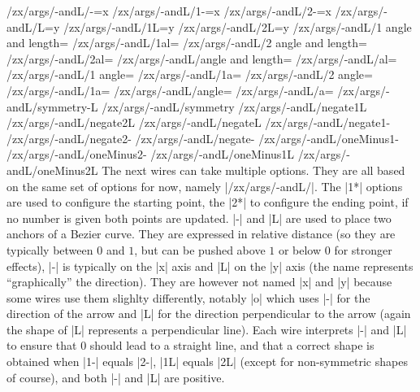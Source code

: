 \documentclass[a4paper]{ltxdoc}
\begin{document}
{\begin{pgfmanualentry}
  \makeatletter
  \def\extrakeytext{style, }
  \extractkey/zx/args/-andL/-=x\@nil%
  \extractkey/zx/args/-andL/1-=x\@nil%
  \extractkey/zx/args/-andL/2-=x\@nil%
  \extractkey/zx/args/-andL/L=y\@nil%
  \extractkey/zx/args/-andL/1L=y\@nil%
  \extractkey/zx/args/-andL/2L=y\@nil%
  \extractkey/zx/args/-andL/1 angle and length=\@nil%
  \extractkey/zx/args/-andL/1al=\@nil%
  \extractkey/zx/args/-andL/2 angle and length=\@nil%
  \extractkey/zx/args/-andL/2al=\@nil%
  \extractkey/zx/args/-andL/angle and length=\@nil%
  \extractkey/zx/args/-andL/al=\@nil%
  \extractkey/zx/args/-andL/1 angle=\@nil%
  \extractkey/zx/args/-andL/1a=\@nil%
  \extractkey/zx/args/-andL/2 angle=\@nil%
  \extractkey/zx/args/-andL/1a=\@nil%
  \extractkey/zx/args/-andL/angle=\@nil%
  \extractkey/zx/args/-andL/a=\@nil%
  \extractkey/zx/args/-andL/symmetry-L\@nil%
  \extractkey/zx/args/-andL/symmetry\@nil%
  \extractkey/zx/args/-andL/negate1L\@nil%
  \extractkey/zx/args/-andL/negate2L\@nil%
  \extractkey/zx/args/-andL/negateL\@nil%
  \extractkey/zx/args/-andL/negate1-\@nil%
  \extractkey/zx/args/-andL/negate2-\@nil%
  \extractkey/zx/args/-andL/negate-\@nil%
  \extractkey/zx/args/-andL/oneMinus1-\@nil%
  \extractkey/zx/args/-andL/oneMinus2-\@nil%
  \extractkey/zx/args/-andL/oneMinus1L\@nil%
  \extractkey/zx/args/-andL/oneMinus2L\@nil%
  \makeatother
  \pgfmanualbody
  The next wires can take multiple options. They are all based on the same set of options for now, namely |/zx/args/-andL/|. The |1*| options are used to configure the starting point, the |2*| to configure the ending point, if no number is given both points are updated. |-| and |L| are used to place two anchors of a Bezier curve. They are expressed in relative distance (so they are typically between $0$ and $1$, but can be pushed above $1$ or below $0$ for stronger effects), |-| is typically on the |x| axis and |L| on the |y| axis (the name represents ``graphically'' the direction). They are however not named |x| and |y| because some wires use them slighlty differently, notably |o| which uses |-| for the direction of the arrow and |L| for the direction perpendicular to the arrow (again the shape of |L| represents a perpendicular line). Each wire interprets |-| and |L| to ensure that $0$ should lead to a straight line, and that a correct shape is obtained when |1-| equals |2-|, |1L| equals |2L| (except for non-symmetric shapes of course), and both |-| and |L| are positive.


\end{pgfmanualentry}}
\end{document}
